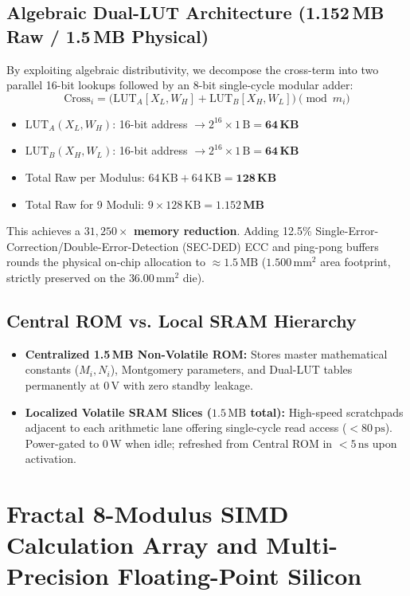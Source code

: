 \documentclass[10pt,journal,compsoc]{IEEEtran}
\begin{document}
\subsection{Algebraic Dual-LUT Architecture (1.152\,MB Raw / 1.5\,MB Physical)}
By exploiting algebraic distributivity, we decompose the cross-term into two parallel 16-bit lookups followed by an 8-bit single-cycle modular adder:
\begin{equation}
\text{Cross}_i = \Big( \text{LUT}_A[X_L, W_H] + \text{LUT}_B[X_H, W_L] \Big) \pmod{m_i}
\end{equation}
\begin{itemize}
    \item $\text{LUT}_A(X_L, W_H)$: 16-bit address $\to 2^{16} \times 1\,\text{B} = \mathbf{64\,\text{KB}}$
    \item $\text{LUT}_B(X_H, W_L)$: 16-bit address $\to 2^{16} \times 1\,\text{B} = \mathbf{64\,\text{KB}}$
    \item Total Raw per Modulus: $64\,\text{KB} + 64\,\text{KB} = \mathbf{128\,\text{KB}}$
    \item Total Raw for 9 Moduli: $9 \times 128\,\text{KB} = \mathbf{1.152\,\text{MB}}$
\end{itemize}
This achieves a \textbf{$31,250\times$ memory reduction}. Adding 12.5\% Single-Error-Correction/Double-Error-Detection (SEC-DED) ECC and ping-pong buffers rounds the physical on-chip allocation to \textbf{$\approx 1.5\,\text{MB}$} ($1.500\,\text{mm}^2$ area footprint, strictly preserved on the $36.00\,\text{mm}^2$ die).

\subsection{Central ROM vs. Local SRAM Hierarchy}
\begin{itemize}
    \item \textbf{Centralized 1.5\,MB Non-Volatile ROM:} Stores master mathematical constants ($M_i, N_i$), Montgomery parameters, and Dual-LUT tables permanently at $0\,\text{V}$ with zero standby leakage.
    \item \textbf{Localized Volatile SRAM Slices ($1.5\,\text{MB}$ total):} High-speed scratchpads adjacent to each arithmetic lane offering single-cycle read access ($<80\,\text{ps}$). Power-gated to $0\,\text{W}$ when idle; refreshed from Central ROM in $<5\,\text{ns}$ upon activation.
\end{itemize}

\section{Fractal 8-Modulus SIMD Calculation Array and Multi-Precision Floating-Point Silicon}\label{sec:arithmetic}
\end{document}
